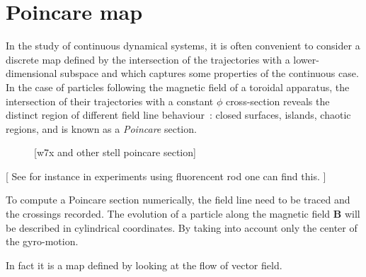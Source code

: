 \chapter{Poincare map}
\newcommand{\dpmap}{\mathcal{D}\mathcal{P}}
\newcommand{\pmap}{\mathcal{P}}
\newcommand{\nfp}{n_\text{fp}}
\newcommand{\z}{z}

In the study of continuous dynamical systems, it is often convenient to consider a discrete map defined by the intersection of the trajectories with a lower-dimensional subspace and which captures some properties of the continuous case. In the case of particles following the magnetic field of a toroidal apparatus, the intersection of their trajectories with a constant $\phi$ cross-section reveals the distinct region of different field line behaviour~: closed surfaces, islands, chaotic regions, and is known as a \textit{Poincare} section.

\begin{figure}[h!]
    \subfloat[W7-X]{%
        \texttt{[image: ]}
    }
    \hfill
    \hfill
    \caption{[w7x and other stell poincare section]}
\end{figure}
[
See for instance 
in experiments using fluorencent rod one can find this.
]

To compute a Poincare section numerically, the field line need to be traced and the crossings recorded. The evolution of a particle along the magnetic field $\textbf{B}$ will be described in cylindrical coordinates. By taking into account only the center of the gyro-motion.

In fact it is a map defined by looking at the flow of vector field.

\noindent
{}


